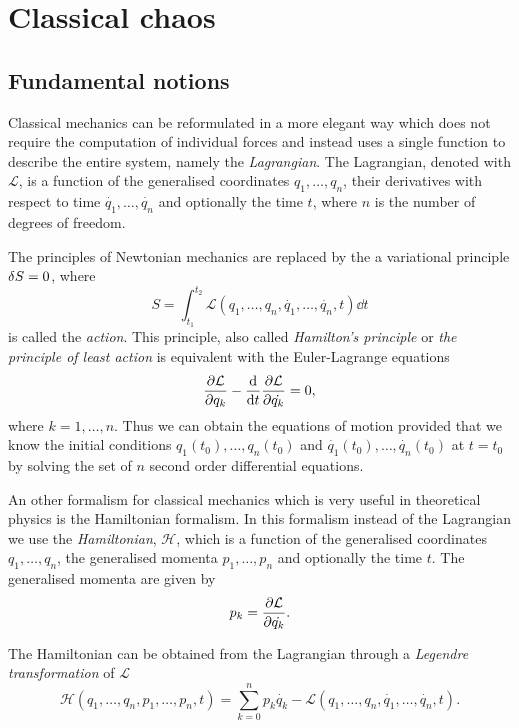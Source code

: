 \documentclass[../thesis.tex]{subfiles}
\theoremstyle{plain}
\begin{document}
\chapter{Classical chaos}

\section{Fundamental notions}

Classical mechanics can be reformulated in a more elegant way which does not
require the computation of individual forces and instead uses a single function to
describe the entire system, namely the \emph{Lagrangian}.
The Lagrangian, denoted with \(\mathcal{L}\), is a function of the generalised
coordinates \(q_1, \dotsc, q_n\), their derivatives with respect to time
\(\dot{q_1}, \dotsc, \dot{q_n}\) and optionally the time \(t\), where \(n\)
is the number of degrees of freedom.

The principles of Newtonian mechanics are replaced by the a variational principle
\(\var{S} = 0\), where
\begin{equation}
  \label{eq:action}
  S = \int_{t_1}^{t_2} \mathcal{L}(q_1, \dotsc, q_n, \dot{q_1}, \dotsc, \dot{q_n},t) \dd{t}
\end{equation}
is called the \emph{action}.
This principle, also called \emph{Hamilton's principle} or \emph{the principle of least action}
is equivalent with the Euler-Lagrange equations
\[
  \pdv{\mathcal{L}}{q_k} - \dv{t}\pdv{\mathcal{L}}{\dot{q_k}} = 0,
\]
where \(k=1,\dotsc, n\).
Thus we can obtain the equations of motion provided that we know the initial
conditions \(q_1(t_0), \dotsc, q_n(t_0)\) and \(\dot{q_1}(t_0), \dotsc, \dot{q_n}(t_0)\)
at \(t=t_0\) by solving the set of \(n\) second order differential equations.

An other formalism for classical mechanics which is very useful in theoretical physics is
the Hamiltonian formalism. In this formalism instead of the \mbox{Lagrangian} we use the
\emph{Hamiltonian}, \(\mathcal{H}\), which is a function of the generalised coordinates
\(q_1, \dotsc, q_n\), the generalised momenta \(p_1, \dotsc, p_n\) and optionally
the time \(t\). The generalised momenta are given by
\[
  p_k = \pdv{\mathcal{L}}{\dot{q_k}}.
\]

The Hamiltonian can be obtained from the Lagrangian through a \emph{Legendre transformation} of
\(\mathcal{L}\)
\begin{equation}
  \label{eq:legendre-tr}
  \mathcal{H}(q_1, \dotsc, q_n, p_1, \dotsc, p_n, t)
  = \sum_{k=0}^n p_k\dot{q_k} - \mathcal{L}(q_1, \dotsc, q_n, \dot{q_1}, \dotsc, \dot{q_n}, t).
\end{equation}
\end{document}
